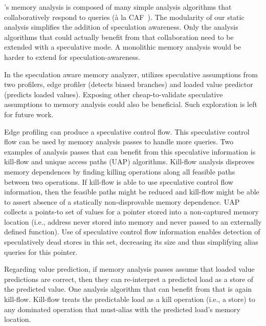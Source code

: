 \name's memory analysis is composed of many simple analysis algorithms
that collaboratively respond to queries (\`{a} la
CAF~\cite{johnson:cgo:17}).
%
The modularity of our static analysis simplifies the addition of
speculation awareness.  Only the analysis algorithms that could
actually benefit from that collaboration need to be extended with a
speculative mode.
%
A monolithic memory analysis would be harder to extend for
speculation-awareness.

In the speculation aware memory analyzer, \name utilizes speculative
assumptions from two profilers, edge profiler (detects biased
branches) and loaded value predictor (predicts loaded values).
%
Exposing other cheap-to-validate speculative assumptions to memory
analysis could also be beneficial.  Such exploration is left for
future work.

Edge profiling can produce a speculative control flow. This
speculative control flow can be used by memory analysis passes to
handle more queries.
%
Two examples of analysis passes that can benefit from this speculative
information is kill-flow and unique access paths (UAP) algorithms.
%
Kill-flow analysis disproves memory dependences by finding killing
operations along all feasible paths between two operations. If
kill-flow is able to use speculative control flow information, then
the feasible paths might be reduced and kill-flow might be able to
assert absence of a statically non-disprovable memory dependence.
%
UAP collects a points-to set of values for a pointer stored into a
non-captured memory location (i.e., address never stored into memory
and never passed to an externally defined function).
Use of speculative control flow information enables detection of
speculatively dead stores in this set, decreasing its size and thus
simplifying alias queries for this pointer.


Regarding value prediction, if memory analysis passes assume that
loaded value predictions are correct, then they can re-interpret a
predicted load as a store of the predicted value. One analysis
algorithm that can benefit from that is again kill-flow. Kill-flow
treats the predictable load as a kill operation (i.e., a store) to any
dominated operation that must-alias with the predicted load's memory
location.

